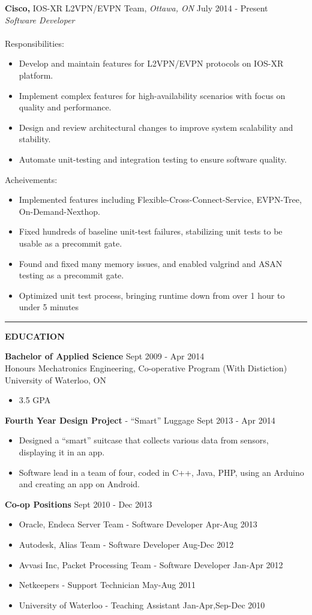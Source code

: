 \documentclass{letter}
\begin{document}
{\bf Cisco,} IOS-XR L2VPN/EVPN Team, {\sl Ottawa, ON} \hfill July 2014 - Present \\
{\sl Software Developer} \\ \\
Responsibilities:
\begin{itemize}
  \item Develop and maintain features for L2VPN/EVPN protocols on IOS-XR platform.
  \item Implement complex features for high-availability scenarios with focus on quality and performance.
  \item Design and review architectural changes to improve system scalability and stability.
  \item Automate unit-testing and integration testing to ensure software quality.
\end{itemize}
Acheivements:
\begin{itemize}
  \item Implemented features including Flexible-Cross-Connect-Service, EVPN-Tree, On-Demand-Nexthop.
  \item Fixed hundreds of baseline unit-test failures, stabilizing unit tests to be usable as a precommit gate.
  \item Found and fixed many memory issues, and enabled valgrind and ASAN testing as a precommit gate.
  \item Optimized unit test process, bringing runtime down from over 1 hour to under 5 minutes
\end{itemize}
\vskip 2pt
\hrule
{\large\bf EDUCATION}

{\bf Bachelor of Applied Science} \hfill Sept 2009 - Apr 2014 \\
Honours Mechatronics Engineering, Co-operative Program (With Distiction) \hfill University of Waterloo, ON
\begin{itemize}
  \item 3.5 GPA
\end{itemize}

{\bf Fourth Year Design Project} - ``Smart'' Luggage \hfill Sept 2013 - Apr 2014
\begin{itemize}
  \item Designed a ``smart'' suitcase that collects various data from sensors, displaying it in an app.
  \item Software lead in a team of four, coded in C++, Java, PHP, using an Arduino and creating an app on Android.
\end{itemize}

{\bf Co-op Positions} \hfill Sept 2010 - Dec 2013
\begin{itemize}
  \item Oracle, Endeca Server Team - Software Developer \hfill Apr-Aug 2013
  \item Autodesk, Alias Team - Software Developer \hfill Aug-Dec 2012
  \item Avvasi Inc, Packet Processing Team - Software Developer \hfill Jan-Apr 2012
  \item Netkeepers - Support Technician \hfill May-Aug 2011
  \item University of Waterloo - Teaching Assistant \hfill Jan-Apr,Sep-Dec 2010
\end{itemize}
\end{document}
